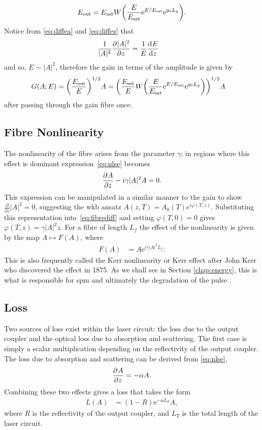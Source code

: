 \begin{align*}
E_{\textrm{out}} = \Es W \left( \frac{E}{\Es} \textrm{e}^{E/\Es} \textrm{e}^{g_0 L_g} \right).
\end{align*}
Notice from \eqref{eq:diffea} and \eqref{eq:diffez} that
\begin{align*}
\frac{1}{|A|^2}\frac{\partial^{}|A|^2}{\partial{z}^{}} &= \frac{1}{E}\frac{\textrm{d}^{}E}{\textrm{d}{z}^{}}
\end{align*}
and so, $E \sim |A|^2$, therefore the gain in terms of the amplitude is given by
\begin{align*}
G(A;E) &= \left(\frac{E_{\textrm{out}}}{E}\right)^{1/2}A = \left( \frac{\Es}{E} W \left( \frac{E}{\Es} \textrm{e}^{E/\Es} \textrm{e}^{g_0 L_g} \right) \right)^{1/2} A
\end{align*}
after passing through the gain fibre once.

\subsection{Fibre Nonlinearity}
The nonlinearity of the fibre arises from the parameter $\gamma$; in regions where this effect is dominant expression~\eqref{eq:nlse} becomes
\begin{align}
\label{eq:fibrediff}
	\frac{\partial^{}A}{\partial{z}^{}} - i \gamma |A|^2 A = 0.
\end{align}
This expression can be manipulated in a similar manner to the gain to show $\frac{\partial}{\partial z} |A|^2 = 0$, suggesting the \acrshort{wkb} ansatz $A(z,T) = A_0(T) e^{i \varphi(T,z)}$. Substituting this representation into~\eqref{eq:fibrediff} and setting $\varphi(T,0)=0$ gives $\varphi(T,z) = \gamma |A|^2 z$. For a fibre of length $L_f$ the effect of the nonlinearity is given by the map $A \mapsto F(A)$, where
\begin{align*}
F(A) &= A \textrm{e}^{i \gamma |A|^2 L_f}.
\end{align*}
This is also frequently called the Kerr nonlinearity or Kerr effect after John Kerr who discovered the effect in 1875. As we shall see in Section \ref{chap:energy}, this is what is responsible for \acrlong{spm} and ultimately the degradation of the pulse \cite{desurvire, dunlop, martinez1984, tamura1996}.

\subsection{Loss}
Two sources of loss exist within the laser circuit: the loss due to the output coupler and the optical loss due to absorption and scattering. The first case is simply a scalar multiplication depending on the reflectivity of the output coupler. The loss due to absorption and scattering can be derived from \eqref{eq:nlse},
\begin{align*}
\frac{\partial^{}A}{\partial{z}^{}} = - \alpha A.
\end{align*}
Combining these two effects gives a loss that takes the form
\begin{align*}
L(A) &= (1 - R) \textrm{e}^{- \alpha L_T}A,
\end{align*}
where $R$ is the reflectivity of the output coupler, and $L_T$ is the total length of the laser circuit.

